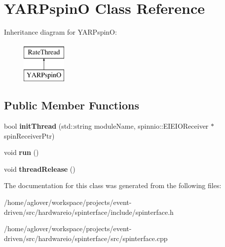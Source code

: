 \hypertarget{classYARPspinO}{}\section{Y\+A\+R\+PspinO Class Reference}
\label{classYARPspinO}
Inheritance diagram for Y\+A\+R\+PspinO\+:\begin{figure}[H]
\begin{center}
\leavevmode
\includegraphics[height=2.000000cm]{classYARPspinO}
\end{center}
\end{figure}
\subsection*{Public Member Functions}
\begin{DoxyCompactItemize}
\item 
bool {\bfseries init\+Thread} (std\+::string module\+Name, spinnio\+::\+E\+I\+E\+I\+O\+Receiver $\ast$spin\+Receiver\+Ptr)\hypertarget{classYARPspinO_a6c43538e8a723f5d737b6bb7b67f6552}{}\label{classYARPspinO_a6c43538e8a723f5d737b6bb7b67f6552}

\item 
void {\bfseries run} ()\hypertarget{classYARPspinO_aff0148bb4f1b5a40122657ecc2cb7561}{}\label{classYARPspinO_aff0148bb4f1b5a40122657ecc2cb7561}

\item 
void {\bfseries thread\+Release} ()\hypertarget{classYARPspinO_a2e5c1ad532978c130c87b8159c2a3a0c}{}\label{classYARPspinO_a2e5c1ad532978c130c87b8159c2a3a0c}

\end{DoxyCompactItemize}


The documentation for this class was generated from the following files\+:\begin{DoxyCompactItemize}
\item 
/home/aglover/workspace/projects/event-\/driven/src/hardwareio/spinterface/include/spinterface.\+h\item 
/home/aglover/workspace/projects/event-\/driven/src/hardwareio/spinterface/src/spinterface.\+cpp\end{DoxyCompactItemize}
